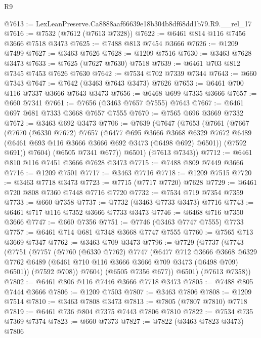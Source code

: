 \begin{lexlean}{R9}
\begin{coremodule}
@7613 := LexLeanPreserve.Ca8888aaf66639e18b304b8df68dd1b79.R9.__rel_17
@7616 := @7532 (@7612 (@7613 @7328))
@7622 := @6461 @814 @116 @7456 @3666 @7518 @3473
@7625 := @7488 @813 @7454 @3666
@7626 := @1209 @7499
@7627 := @3463 @7626
@7628 := @1209 @7516
@7630 := @3463 @7628 @3473
@7633 := @7625 (@7627 @7630) @7518
@7639 := @6461 @703 @812 @7345 @7453 @7626 @7630
@7642 := @7534 @702 @7339 @7344
@7643 := @660 @7343
@7647 := @7642 (@3463 @7643 @3473) @7626
@7653 := @6461 @700 @116 @7337 @3666 @7643 @3473
@7656 := @6468 @699 @7335 @3666
@7657 := @660 @7341
@7661 := @7656 (@3463 @7657 @7555) @7643
@7667 := @6461 @697 @681 @7333 @3668 @7657 @7555
@7670 := @7565 @696 @3669 @7332
@7672 := @3463 @692 @3473
@7706 := @7639
    (@7647
      (@7653
        (@7661
          (@7667
            (@7670
              (@6330 @7672)
              @7657
              (@6477
                @695
                @3666
                @3668
                @6329
                @7672
                @6489
                (@6461 @693 @116 @3666 @3666 @692 @3473 (@6498 @692) @6501))
              (@7592 @691))
            @7604)
          (@6505 @7341 @677))
        @6501)
      (@7613 @7343))
@7712 := @6461 @810 @116 @7451 @3666 @7628 @3473
@7715 := @7488 @809 @7449 @3666
@7716 := @1209 @7501
@7717 := @3463 @7716
@7718 := @1209 @7515
@7720 := @3463 @7718 @3473
@7723 := @7715 (@7717 @7720) @7628
@7729 := @6461 @720 @808 @7360 @7448 @7716 @7720
@7732 := @7534 @719 @7354 @7359
@7733 := @660 @7358
@7737 := @7732 (@3463 @7733 @3473) @7716
@7743 := @6461 @717 @116 @7352 @3666 @7733 @3473
@7746 := @6468 @716 @7350 @3666
@7747 := @660 @7356
@7751 := @7746 (@3463 @7747 @7555) @7733
@7757 := @6461 @714 @681 @7348 @3668 @7747 @7555
@7760 := @7565 @713 @3669 @7347
@7762 := @3463 @709 @3473
@7796 := @7729
    (@7737
      (@7743
        (@7751
          (@7757
            (@7760
              (@6330 @7762)
              @7747
              (@6477
                @712
                @3666
                @3668
                @6329
                @7762
                @6489
                (@6461 @710 @116 @3666 @3666 @709 @3473 (@6498 @709) @6501))
              (@7592 @708))
            @7604)
          (@6505 @7356 @677))
        @6501)
      (@7613 @7358))
@7802 := @6461 @806 @116 @7446 @3666 @7718 @3473
@7805 := @7488 @805 @7444 @3666
@7806 := @1209 @7503
@7807 := @3463 @7806
@7808 := @1209 @7514
@7810 := @3463 @7808 @3473
@7813 := @7805 (@7807 @7810) @7718
@7819 := @6461 @736 @804 @7375 @7443 @7806 @7810
@7822 := @7534 @735 @7369 @7374
@7823 := @660 @7373
@7827 := @7822 (@3463 @7823 @3473) @7806

\end{coremodule}
\end{lexlean}
